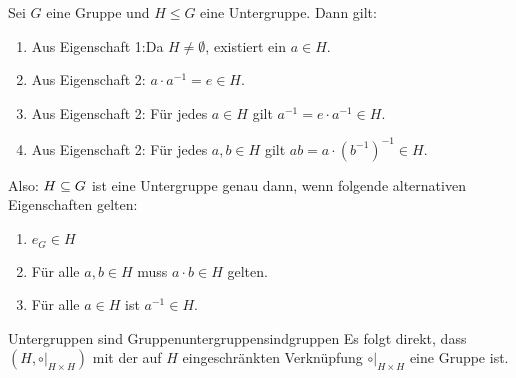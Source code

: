 \begin{übung}\label{exc:untergruppencharakterisierung}
Sei $G$ eine Gruppe und $H \leq G$ eine Untergruppe. Dann gilt:
\begin{enumerate}
\item Aus Eigenschaft 1:Da $H \neq \emptyset$, existiert ein $a \in H$.
\item Aus Eigenschaft 2: $a \cdot a^{-1} = e \in H$.
\item Aus Eigenschaft 2: Für jedes $a \in H$ gilt $a^{-1} = e \cdot a^{-1} \in H$.
\item Aus Eigenschaft 2: Für jedes $a,b \in H$ gilt $ab = a \cdot (b^{-1})^{-1} \in H$.
\end{enumerate}
Also: $H \subseteq G$ ist eine Untergruppe genau dann, wenn folgende alternativen Eigenschaften gelten:
\begin{enumerate}[1.{$^\ast $}]
\item $e_G \in H$
\item Für alle $a,b \in H$ muss $a \cdot b \in H$ gelten.
\item Für alle $a \in H$ ist $a^{-1} \in H$.
\end{enumerate}
\end{übung}
\begin{korollar}{Untergruppen sind Gruppen}{untergruppensindgruppen}
Es folgt direkt, dass $(H, \circ|_{H \times H})$ mit der auf $H$ eingeschränkten Verknüpfung $\circ|_{H \times H}$ eine Gruppe ist. 
\end{korollar}

